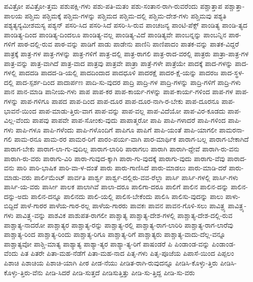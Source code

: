 {ಪವಿತ್ರೋ
ಪವಿತ್ರೋ-ತ್ತಮ
ಪಶುಪಕ್ಷಿ-ಗಳು
ಪಶು-ಪತಿ-ಮತಂ
ಪಶು-ಸಂತಾನ-ರಾಗಿ-ರುವರೆಂದು
ಪಶ್ಚಾತ್ತಾಪ
ಪಶ್ಚಾತ್ತಾ-ಪಾಲಯ
ಪಶ್ಚಿಮ
ಪಶ್ಚಿಮಕ್ಕೆ
ಪಶ್ಚಿಮ-ಗಳನ್ನು
ಪಶ್ಚಿಮದ
ಪಶ್ಚಿಮ-ದಲ್ಲಿ
ಪಶ್ಚಿಮ-ದೇಶ-ಗಳು
ಪಶ್ಚಿಮವು
ಪಶ್ಯತಿ
ಪಶ್ಯತ್ಯನ್ಯಮೀಶಮಸ್ಯ
ಪಶ್ಯನ್
ಪಸರಿ-ಸಿದ
ಪಸರಿ-ಸಿದೆ
ಪಸರಿ-ಸಿ-ರುವ
ಪಾಂಚಜನ್ಯ
ಪಾಂಟಿ-ಪೆಕ್ಸ್
ಪಾಂಡಿತ್ಯ
ಪಾಂಡಿ-ತ್ಯದ
ಪಾಂಡಿತ್ಯ-ದಿಂದ
ಪಾಂಡಿತ್ಯ-ದಿಂದಲೂ
ಪಾಂಡಿತ್ಯ-ವಲ್ಲ
ಪಾಂಡಿತ್ಯ-ವಿದೆ
ಪಾಂಡಿತ್ಯವೇ
ಪಾಂಬನ್ನನ್ನು
ಪಾಂಬನ್ನಿನ
ಪಾಠ-ಗಳಿಗೆ
ಪಾಠ-ದಲ್ಲಿ-ರುವ
ಪಾಠ-ವನ್ನು
ಪಾಡಿಗೆ
ಪಾಡು
ಪಾಡೇನು
ಪಾಣಿನಿ
ಪಾಣಿಪಾದಂ
ಪಾತಕ-ವನ್ನು
ಪಾತಕ-ವಿದ್ದರೆ
ಪಾತ್ರಕ್ಕೆ
ಪಾತ್ರ-ಗಳ
ಪಾತ್ರ-ಗಳನ್ನು
ಪಾತ್ರ-ಗಳಿಗೆ
ಪಾತ್ರ-ದಲ್ಲಿ
ಪಾತ್ರ-ರಾಗಲಿ
ಪಾತ್ರ-ರಾದ-ವರಲ್ಲಿ
ಪಾತ್ರರು
ಪಾತ್ರಾ-ಪಾತ್ರ-ಗಳ
ಪಾತ್ರ-ವನ್ನು
ಪಾತ್ರ-ವಾಗಿದೆ
ಪಾತ್ರ-ವಾದ
ಪಾತ್ರವು
ಪಾತ್ರವೇ
ಪಾತ್ರಾ
ಪಾತ್ರೆ-ಗಳೇ
ಪಾತ್ರೆಯೇ
ಪಾದಕ್ಕೆ
ಪಾದ-ಗಳನ್ನು
ಪಾದ-ಗಳಲ್ಲಿ
ಪಾದದಡಿ
ಪಾದದ-ಡಿ-ಯಲ್ಲಿ
ಪಾದದಿಂದಾದ
ಪಾದಧೂಳಿ
ಪಾದರಕ್ಷೆ
ಪಾದರ-ಕ್ಷೆ-ಯನ್ನು
ಪಾದರಜ
ಪಾದ-ಸ್ಥಳ-ದಲ್ಲಿ
ಪಾದ-ಸ್ಪರ್ಶ-ದಿಂದ
ಪಾದಾರ್ಪಣ
ಪಾದಿ-ಸು-ವುದರ
ಪಾದ್ರಿ
ಪಾದ್ರಿ-ಗಳ
ಪಾದ್ರಿ-ಗಳನ್ನು
ಪಾದ್ರಿ-ಗಳಿಗೆ
ಪಾದ್ರಿ-ಗಳು
ಪಾನ
ಪಾನ-ಮಾಡಿ
ಪಾನೀಯ-ಗಳು
ಪಾಪ
ಪಾಪ-ಕರ
ಪಾಪ-ಕಾರ್ಯ-ಗಳನ್ನು
ಪಾಪ-ಕಾರ್ಯ-ಗಳಿಂದ
ಪಾಪ-ಗಳ
ಪಾಪ-ಗಳನ್ನು
ಪಾಪ-ಗಳಿಗೂ
ಪಾಪದ
ಪಾಪ-ದಿಂದ
ಪಾಪ-ದೂರ
ಪಾಪ-ದೂರ-ನಾಗಿ-ರ-ಬೇಕು
ಪಾಪ-ದೂರನೂ
ಪಾಪ-ಭಾವನೆ-ಯಿಂದ
ಪಾಪ-ಮಾಡು-ತ್ತಿರು-ವಾಗ
ಪಾಪ-ವನ್ನು
ಪಾಪ-ವಲ್ಲ
ಪಾಪ-ವಿದೆಯೋ
ಪಾಪ-ವಿರ-ಕೂಡದು
ಪಾಪ-ವಿಲ್ಲ-ವೆಂದು
ಪಾಪವು
ಪಾಪವೇ
ಪಾಪ-ಸೋಂಕು-ವುದು
ಪಾಪಾತ್ಮರೋ
ಪಾಪಿ
ಪಾಪಿ-ಗಳಾದರೆ
ಪಾಪಿ-ಗಳಿಂದ
ಪಾಪಿ-ಗಳು
ಪಾಪಿ-ಗಳೂ
ಪಾಪಿ-ಗಳೆಂದು
ಪಾಪಿ-ಗಳೊಂದಿಗೆ
ಪಾಪಿಗೂ
ಪಾಪಿಗೆ
ಪಾಪಿ-ಯಂತೆ
ಪಾಪಿ-ಯಾಗಲೀ
ಪಾಮರನಾ-ಗಲಿ
ಪಾಮ-ರನೂ
ಪಾಮ-ರರ
ಪಾಮರ-ರಿಗೆ
ಪಾರಂ-ಪರ್ಯ-ವಾಗಿ
ಪಾರ-ಮಾರ್ಥಿಕ
ಪಾರಾಗ-ಬಲ್ಲ
ಪಾರಾಗ-ಬೇಕಾಗಿದೆ
ಪಾರಾಗ-ಬೇಕು
ಪಾರಾಗ-ಲಾ-ಗು-ವುದಿಲ್ಲ
ಪಾರಾಗ-ಲಾರಿರಿ
ಪಾರಾಗಲು
ಪಾರಾಗಿ
ಪಾರಾಗಿ-ದ್ದೇವೆ
ಪಾರಾಗಿ-ರು-ವನು
ಪಾರಾಗಿ-ರು-ವರು
ಪಾರಾಗು-ವಿರಿ
ಪಾರಾ-ಗುವುದ-ಕ್ಕಾಗಿ
ಪಾರಾ-ಗು-ವುದಕ್ಕೆ
ಪಾರಾಗು-ವುದು
ಪಾರಾಗು-ವೆವು
ಪಾರಾದ-ವನು
ಪಾರಿ
ಪಾರಿ-ಭಾಷಿಕ
ಪಾರಿ-ವಾ-ಳ-ದಂತೆ
ಪಾರು
ಪಾರು-ಗಾಣಿಸಿದೆ
ಪಾರು-ಮಾಡಲು
ಪಾರು-ಮಾಡಿ-ದರೆ
ಪಾರು-ಮಾಡು-ವರು
ಪಾರ್ಲಿಮೆಂಟ್
ಪಾರ್ವತಿ
ಪಾರ್ಶ್ವ
ಪಾರ್ಶ್ವ-ದಲ್ಲಿರು-ವವ-ರೆಲ್ಲಾ
ಪಾರ್ಸಿ
ಪಾರ್ಸಿ-ಗಳಲ್ಲಿ
ಪಾರ್ಸಿ-ಗಳು
ಪಾರ್ಸಿ-ಯ-ವರು
ಪಾರ್ಸೀ
ಪಾಲಕ
ಪಾಲಾಗಿವೆ
ಪಾಲಾ-ದರೂ
ಪಾಲಿಗಾ-ದರೂ
ಪಾಲಿಗೆ
ಪಾಲಿನ
ಪಾಲಿನ-ದನ್ನು
ಪಾಲಿನ-ದನ್ನು-ಅದು
ಪಾಲಿನ-ದನ್ನೂ
ಪಾಲಿನದು
ಪಾಲಿ-ಯಲ್ಲಿ
ಪಾಲಿಸ-ಬೇಕೆಂದು
ಪಾಲಿಸಿ
ಪಾಲಿಸು-ವುದನ್ನು
ಪಾಲು
ಪಾಳು-ಬಿದ್ದಿದೆ
ಪಾಳೆ-ಗಾರರ
ಪಾಳೆಯ-ಗಾರ-ರಲ್ಲ
ಪಾಳೆಯ-ಗಾರರು
ಪಾವಕಃ
ಪಾವನ
ಪಾವನ-ಗೊಳಿ-ಸಲು
ಪಾವಿತ್ರ್ಯ
ಪಾವಿತ್ರ್ಯ-ಗಳು
ಪಾವಿತ್ರ್ಯ-ವನ್ನು
ಪಾಶವಿಕ
ಪಾಶುಪತ-ರಾಗಲೀ
ಪಾಶ್ಚಾತ್ಯ
ಪಾಶ್ಚಾತ್ಯ-ದೇಶ-ಗಳಲ್ಲಿ
ಪಾಶ್ಚಾತ್ಯ-ದೇಶ-ದಲ್ಲಿ-ರುವ
ಪಾಶ್ಚಾತ್ಯ-ನಾದರೋ
ಪಾಶ್ಚಾತ್ಯರ
ಪಾಶ್ಚಾತ್ಯ-ರನ್ನು
ಪಾಶ್ಚಾತ್ಯ-ರಲ್ಲಿ
ಪಾಶ್ಚಾತ್ಯ-ರಾಗ-ಲಾರಿರಿ
ಪಾಶ್ಚಾತ್ಯ-ರಾಗ-ಲಾರೆವು
ಪಾಶ್ಚಾತ್ಯ-ರಿಂದ
ಪಾಶ್ಚಾತ್ಯ-ರಿಂದು
ಪಾಶ್ಚಾತ್ಯ-ರಿಗೂ
ಪಾಶ್ಚಾತ್ಯ-ರಿಗೆ
ಪಾಶ್ಚಾತ್ಯರು
ಪಾಶ್ಚಾತ್ಯ-ವಾದು-ದೆಲ್ಲ-ವನ್ನೂ
ಪಾಶ್ಚಾತ್ಯವೋ
ಪಾಶ್ಚಿ-ಮಾತ್ಯ
ಪಾಶ್ಯಾತ್ಯ
ಪಾಶ್ಯಾ-ತ್ಯರ
ಪಾಶ್ಯಾ-ತ್ಯ-ರಿಗೆ
ಪಾಷಂಡರೆ
ಪಿ
ಪಿಂಡಾಂಡ-ವನ್ನು
ಪಿಂಡಾಂಡ-ವೆಂದು
ಪಿತ
ಪಿತರೇ
ಪಿತಾ-ಮಹ-ನೆಡೆಗೆ
ಪಿತಾ-ಮಹ-ನಾದ
ಪಿತೃ-ಗಳು
ಪಿತೃ-ಪೂಜೆಯ
ಪಿಪಾಸೆ-ಯಿಂದ
ಪಿಪ್ಪಲಂ
ಪಿಶಾಚಿ
ಪಿಶಾಚಿಯ
ಪಿಶಾಚಿ-ಯಾಗಿ
ಪೀಠ
ಪೀಡ-ನೆಯು
ಪೀಡಿತ-ರಾಗಿ-ರುವುದನ್ನೂ
ಪೀಡಿಸಿ-ಕೊಳ್ಳು-ತ್ತಿರು
ಪೀಡಿಸಿ-ಕೊಳ್ಳು-ತ್ತಿರು-ವೆನು
ಪೀಡಿ-ಸಿದರೆ
ಪೀಡಿ-ಸುತ್ತದೆ
ಪೀಡಿಸುತ್ತಿತ್ತು
ಪೀಡಿ-ಸು-ತ್ತಿದ್ದ
ಪೀಡಿ-ಸು-ವರು
}
